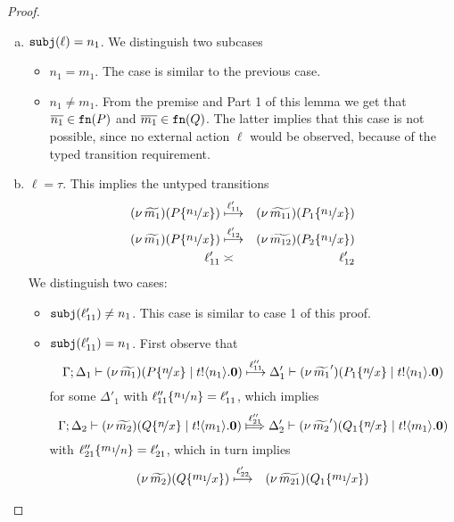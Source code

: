 \begin{proof}
\begin{enumerate}[1.]
\begin{enumerate}[(a)]
					\item	$\mathtt{subj}(\ell) = n_1$. We distinguish two subcases
							\begin{itemize}
								\item	$n_1 = m_1$. The case is similar to the previous case.
								\item	$n_1 \not= m_1$.
										From the premise and Part 1 of this lemma we get
										that $\overline{n_1} \in \mathtt{fn}(P)$ and $\overline{m_1} \in \mathtt{fn}(Q)$.
										The latter implies that this case is not possible, since
										no external action $\ell$ would be observed, because
										of the typed transition requirement.
							\end{itemize}

					\item	$\ell = \tau$. This implies the untyped transitions
							\begin{eqnarray}
								\newsp{\widetilde{m_1}}{P \subst{n_1}{x}} &\hby{\ell_{11}'}& \newsp{\widetilde{m_{11}}}{P_1 \subst{n_1}{x}}
								\label{lem:tr_app_41}\\
								\newsp{\widetilde{m_1}}{P \subst{n_1}{x}} &\hby{\ell_{12}'}& \newsp{\widetilde{m_{12}}}{P_2 \subst{n_1}{x}}
								\label{lem:tr_app_42}\\
								\ell_{11}' &\asymp& \ell_{12}'
							\end{eqnarray}
							We distinguish two cases:
							\begin{itemize}
								\item	$\mathtt{subj}(\ell_{11}') \not= n_1$. This case is similar to case 1 of this proof.
								\item	$\mathtt{subj}(\ell_{11}') = n_1$.
										First observe that
										\[
											\horel{\Gamma}{\Delta_1}{\newsp{\widetilde{m_1}}{P \subst{n}{x} \Par \bout{t}{n_1} \inact}}
											{ \hby{\ell_{11}''} }
											{\Delta_1'}{\newsp{\widetilde{m_1}'}{P_1 \subst{n}{x} \Par \bout{t}{n_1} \inact}}
										\]
										for some $\Delta'_1$
										with $\ell_{11}'' \subst{n_1}{n}  = \ell_{11}' $,
										which implies
										\[
											\horel{\Gamma}{\Delta_2}{\newsp{\widetilde{m_2}}{Q \subst{n}{x} \Par \bout{t}{m_1} \inact}}
											{ \Hby{\ell_{21}''} }
											{\Delta_2'}{\newsp{\widetilde{m_2}'}{Q_1 \subst{n}{x} \Par \bout{t}{m_1} \inact}}
										\]
										with $\ell_{21}'' \subst{m_1}{n}  = \ell_{21}' $,
										which in turn implies
										\begin{eqnarray}
											\newsp{\widetilde{m_2}}{Q \subst{m_1}{x}} &\hby{\ell_{22}'}& \newsp{\widetilde{m_{21}}}{Q_1 \subst{m_1}{x}}

\end{eqnarray}
\end{itemize}
\end{enumerate}
\end{enumerate}
\end{proof}
